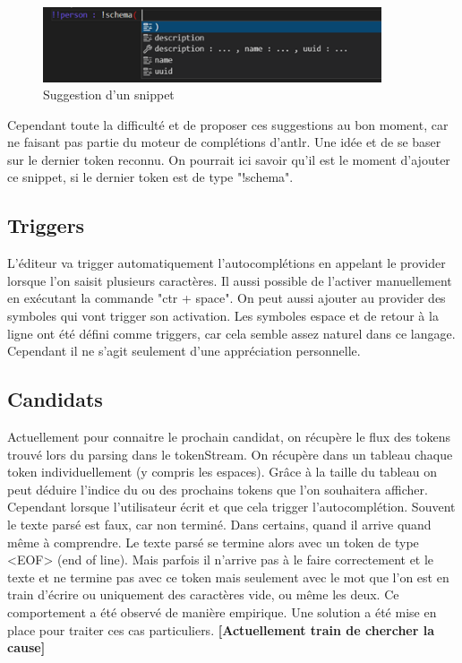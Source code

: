 \documentclass[
    iict, %
    il, %
]{heig-tb}
\begin{document}
\begin{figure}[!ht]
    \begin{center}
        \includegraphics[width=10cm]{assets/figures/snippet-suggestion.png}
    \end{center}
    \caption[Suggestion d'un snippet]{\label{snippet-suggestion} Suggestion d'un snippet}
\end{figure}

Cependant toute la difficulté et de proposer ces suggestions au bon moment, car ne faisant pas partie du moteur de complétions d'antlr. Une idée et de se baser sur le dernier token reconnu. On pourrait ici savoir qu'il est le moment d'ajouter ce snippet, si le dernier token est de type "!schema".

\subsection{Triggers}
L'éditeur va trigger automatiquement l'autocomplétions en appelant le provider lorsque l'on saisit plusieurs caractères. Il aussi possible de l'activer manuellement en exécutant la commande "ctr + space".
On peut aussi ajouter au provider des symboles qui vont trigger son activation. Les symboles espace et de retour à la ligne ont été défini comme triggers, car cela semble assez naturel dans ce langage. Cependant il ne s'agit seulement d'une appréciation personnelle.

\subsection{Candidats}
Actuellement pour connaitre le prochain candidat, on récupère le flux des tokens trouvé lors du parsing dans le tokenStream. On récupère dans un tableau chaque token individuellement (y compris les espaces).  Grâce à la taille du tableau on peut déduire l'indice du ou des prochains tokens que l'on souhaitera afficher.
Cependant lorsque l'utilisateur écrit et que cela trigger l'autocomplétion. Souvent le texte parsé est faux, car non terminé. Dans certains, quand il arrive quand même à comprendre. Le texte parsé se termine alors avec un token de type <EOF> (end of line).
Mais parfois il n'arrive pas à le faire correctement et le texte et ne termine pas avec ce token mais seulement avec le mot que l'on est en train d'écrire ou uniquement des caractères vide, ou même les deux.
Ce comportement a été observé de manière empirique. Une solution a été mise en place pour traiter ces cas particuliers.
\textbf{[Actuellement train de chercher la cause]}
\end{document}
